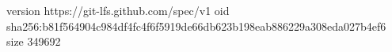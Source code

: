version https://git-lfs.github.com/spec/v1
oid sha256:b81f564904c984df4fc4f6f5919de66db623b198eab886229a308eda027b4ef6
size 349692
